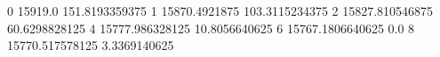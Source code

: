 0 15919.0 151.8193359375
1 15870.4921875 103.3115234375
2 15827.810546875 60.6298828125
4 15777.986328125 10.8056640625
6 15767.1806640625 0.0
8 15770.517578125 3.3369140625
